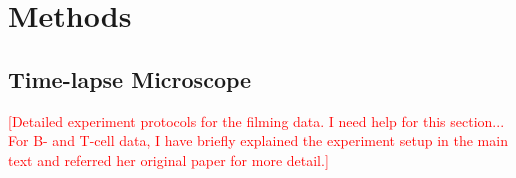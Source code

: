 \documentclass[11pt, a4paper]{article}
\begin{document}

\nolinenumbers
\section{Methods}
\linenumbers

\nolinenumbers
\subsection{Time-lapse Microscope}
\textcolor{red}{[Detailed experiment protocols for the filming data. I need help for this section... For B- and T-cell data, I have briefly explained the experiment setup in the main text and referred her original paper for more detail.]}
\linenumbers

\nolinenumbers
\end{document}

